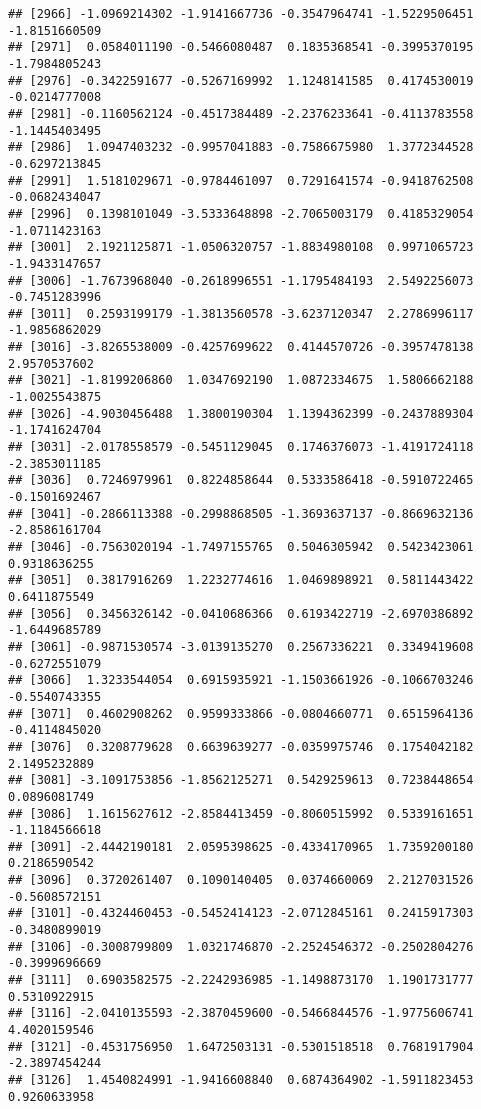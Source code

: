 \documentclass[
]{article}
\begin{document}
\begin{verbatim}
## [2966] -1.0969214302 -1.9141667736 -0.3547964741 -1.5229506451 -1.8151660509
## [2971]  0.0584011190 -0.5466080487  0.1835368541 -0.3995370195 -1.7984805243
## [2976] -0.3422591677 -0.5267169992  1.1248141585  0.4174530019 -0.0214777008
## [2981] -0.1160562124 -0.4517384489 -2.2376233641 -0.4113783558 -1.1445403495
## [2986]  1.0947403232 -0.9957041883 -0.7586675980  1.3772344528 -0.6297213845
## [2991]  1.5181029671 -0.9784461097  0.7291641574 -0.9418762508 -0.0682434047
## [2996]  0.1398101049 -3.5333648898 -2.7065003179  0.4185329054 -1.0711423163
## [3001]  2.1921125871 -1.0506320757 -1.8834980108  0.9971065723 -1.9433147657
## [3006] -1.7673968040 -0.2618996551 -1.1795484193  2.5492256073 -0.7451283996
## [3011]  0.2593199179 -1.3813560578 -3.6237120347  2.2786996117 -1.9856862029
## [3016] -3.8265538009 -0.4257699622  0.4144570726 -0.3957478138  2.9570537602
## [3021] -1.8199206860  1.0347692190  1.0872334675  1.5806662188 -1.0025543875
## [3026] -4.9030456488  1.3800190304  1.1394362399 -0.2437889304 -1.1741624704
## [3031] -2.0178558579 -0.5451129045  0.1746376073 -1.4191724118 -2.3853011185
## [3036]  0.7246979961  0.8224858644  0.5333586418 -0.5910722465 -0.1501692467
## [3041] -0.2866113388 -0.2998868505 -1.3693637137 -0.8669632136 -2.8586161704
## [3046] -0.7563020194 -1.7497155765  0.5046305942  0.5423423061  0.9318636255
## [3051]  0.3817916269  1.2232774616  1.0469898921  0.5811443422  0.6411875549
## [3056]  0.3456326142 -0.0410686366  0.6193422719 -2.6970386892 -1.6449685789
## [3061] -0.9871530574 -3.0139135270  0.2567336221  0.3349419608 -0.6272551079
## [3066]  1.3233544054  0.6915935921 -1.1503661926 -0.1066703246 -0.5540743355
## [3071]  0.4602908262  0.9599333866 -0.0804660771  0.6515964136 -0.4114845020
## [3076]  0.3208779628  0.6639639277 -0.0359975746  0.1754042182  2.1495232889
## [3081] -3.1091753856 -1.8562125271  0.5429259613  0.7238448654  0.0896081749
## [3086]  1.1615627612 -2.8584413459 -0.8060515992  0.5339161651 -1.1184566618
## [3091] -2.4442190181  2.0595398625 -0.4334170965  1.7359200180  0.2186590542
## [3096]  0.3720261407  0.1090140405  0.0374660069  2.2127031526 -0.5608572151
## [3101] -0.4324460453 -0.5452414123 -2.0712845161  0.2415917303 -0.3480899019
## [3106] -0.3008799809  1.0321746870 -2.2524546372 -0.2502804276 -0.3999696669
## [3111]  0.6903582575 -2.2242936985 -1.1498873170  1.1901731777  0.5310922915
## [3116] -2.0410135593 -2.3870459600 -0.5466844576 -1.9775606741  4.4020159546
## [3121] -0.4531756950  1.6472503131 -0.5301518518  0.7681917904 -2.3897454244
## [3126]  1.4540824991 -1.9416608840  0.6874364902 -1.5911823453  0.9260633958

\end{verbatim}
\end{document}
